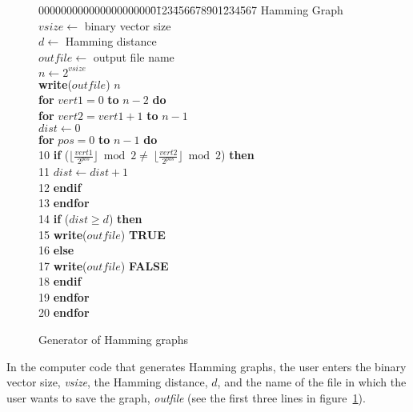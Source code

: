 \begin{figure}
{\footnotesize
\begin{tabbing}
00000000000000000000\=0\=123\=456\=678\=901\=234\=567\= \kill
{} Hamming Graph \+ \\ 
 \> $vsize \leftarrow$  binary vector size \\
 \> $d \leftarrow$ Hamming distance \\
 \> $outfile \leftarrow$ output file name \\
 \> $n \leftarrow 2^{vsize}$ \\
 \> {\bf write}($outfile$)  $n$ \\
 \> {\bf for} $vert1 = 0$ {\bf to} $n-2$ {\bf do} \\
 \> \> {\bf for} $vert2 = vert1+1$ {\bf to} $n-1$ {\do} \\
 \> \> \> $dist \leftarrow 0$ \\
 \> \> \> {\bf for} $pos = 0$ {\bf to} $n-1$ {\bf do} \\
10 \> \> \> \> \> {\bf if} ($\lfloor \frac{vert1}{2^{pos}} \rfloor \bmod 2
                             \neq\ 
                             \lfloor \frac{vert2}{2^{pos}} \rfloor \bmod 2$)
                             {\bf then} \\
11 \> \> \> \> \> \> $dist \leftarrow dist+1$ \\
12 \> \> \> \> \> {\bf endif} \\
13 \> \> \> \> {\bf endfor} \\
14 \> \> \> \> {\bf if} ($dist \geq d$) {\bf then} \\
15 \> \> \> \> \> {\bf write}($outfile$) {\bf TRUE} \\
16 \> \> \> \> {\bf else} \\
17 \> \> \> \> \> {\bf write}($outfile$) {\bf FALSE} \\
18 \> \> \> \> {\bf endif} \\
19 \> \> \> {\bf endfor} \\
20 \> \> {\bf endfor} \\
\end{tabbing}
}
\caption{Generator of Hamming graphs}
\label{alg:hamm}
\end{figure}

In the computer code that generates Hamming graphs, the user
enters the binary vector size, {\em vsize}, the Hamming distance, $d$, and the
name of the file in which the user wants to save the graph, {\em
outfile} (see the first three lines in figure~\ref{alg:hamm}).

